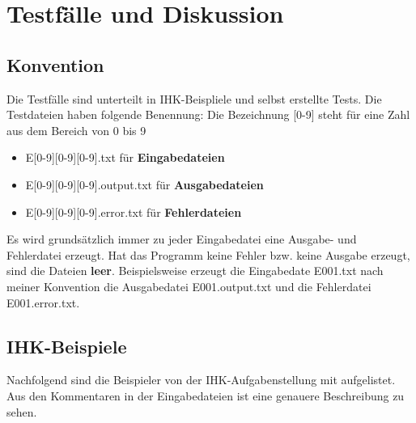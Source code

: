 %

\chapter{Testfälle und Diskussion}
\label{chap:Testing}
\section{Konvention}
Die Testfälle sind unterteilt in IHK-Beispliele und selbst erstellte Tests. Die Testdateien haben folgende Benennung: Die Bezeichnung [0-9] steht für eine Zahl aus dem Bereich von 0 bis 9
\begin{itemize}
\item  E[0-9][0-9][0-9].txt für\textbf{ Eingabedateien}
\item  E[0-9][0-9][0-9].output.txt für\textbf{ Ausgabedateien}
\item  E[0-9][0-9][0-9].error.txt für\textbf{ Fehlerdateien}
\end{itemize}
Es wird grundsätzlich immer zu jeder Eingabedatei eine Ausgabe- und Fehlerdatei erzeugt.
Hat das Programm keine Fehler bzw. keine Ausgabe erzeugt, sind die Dateien \textbf{leer}.
Beispielsweise erzeugt die Eingabedate E001.txt nach meiner Konvention die Ausgabedatei E001.output.txt und die Fehlerdatei E001.error.txt.


\section{IHK-Beispiele}
Nachfolgend sind die Beispieler von der IHK-Aufgabenstellung mit aufgelistet. Aus den Kommentaren in der Eingabedateien ist eine genauere Beschreibung zu sehen.


